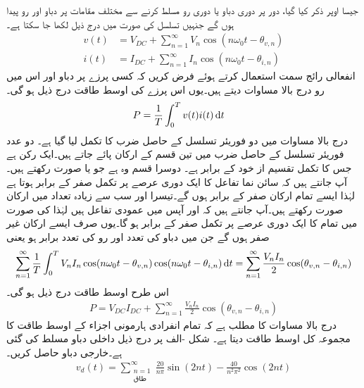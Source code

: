 جیسا اوپر ذکر کیا گیا، دور پر دوری دباو یا دوری رو مسلط کرنے سے مختلف مقامات پر دباو اور رو پیدا ہوں گے جنہیں تسلسل کی صورت میں درج ذیل لکھا جا سکتا ہے۔ 
\begin{align}
v(t)&=V_{DC}+\sum_{n=1}^{\infty} V_n \cos (n\omega_0 t-\theta_{v,n})\\
i(t)&=I_{DC}+\sum_{n=1}^{\infty} I_n \cos (n\omega_0 t-\theta_{i,n})
\end{align}
انفعالی رائج سمت استعمال کرتے ہوئے فرض کریں کہ کسی پرزے پر دباو اور اس میں رو درج بالا مساوات دیتے ہیں۔یوں اس پرزے کی اوسط طاقت درج ذیل ہو گی۔
\begin{align}\label{مساوات_فوریئر_طاقت_الف}
P&=\frac{1}{T}\int_0^T v(t)i(t) \dif t
\end{align}
درج بالا مساوات میں دو فوریئر تسلسل کے حاصل ضرب کا تکمل لیا گیا ہے۔ دو عدد فوریئر تسلسل کے حاصل ضرب  میں تین قسم کے ارکان پائے جاتے ہیں۔ایک رکن  ہے جس کا تکمل تقسیم  از خود  کے برابر ہے۔ دوسرا قسم وہ ہے جو  یا  صورت رکھتے ہیں۔ آپ جانتے ہیں کہ سائن نما تفاعل کا ایک دوری عرصے پر تکمل صفر کے برابر ہوتا ہے لہٰذا ایسے تمام ارکان صفر کے برابر ہوں گے۔تیسرا اور سب سے زیادہ تعداد میں  ارکان  صورت رکھتے ہیں۔آپ جانتے ہیں کہ  اور  آپس میں عمودی تفاعل ہیں لہٰذا  کی صورت میں تمام 
  کا ایک دوری عرصے پر تکمل صفر کے برابر ہو گا۔یوں صرف ایسے ارکان غیر صفر ہوں گے جن میں دباو کی تعدد  اور رو کی تعدد برابر ہو یعنی
\begin{align*}
\sum_{n=1}^{\infty} \frac{1}{T}\int_0^T V_n I_n \cos(n\omega_0 t-\theta_{v,n})\cos(n\omega_0 t-\theta_{i,n}) \dif t=\sum_{n=1}^{\infty} \frac{V_n I_n}{2} \cos(\theta_{v,n}-\theta_{i,n})
\end{align*}
اس طرح اوسط طاقت درج ذیل ہو گی۔
\begin{align}
P=V_{DC}I_{DC}+\sum_{n=1}^{\infty}\frac{ V_n I_n}{2} \cos(\theta_{v,n}-\theta_{i,n})
\end{align}
درج بالا مساوات کا مطلب ہے کہ تمام انفرادی ہارمونی اجزاء کے اوسط طاقت کا مجموعہ کل اوسط طاقت دیتا ہے۔
شکل -الف پر درج ذیل داخلی دباو  مسلط کی گئی ہے۔خارجی دباو  حاصل کریں۔
\begin{align*}
v_d(t)=\sum_{\substack{n=1 \\ \text{طاق}}}^{\infty} \frac{20}{n\pi}\sin (2nt)-\frac{40}{n^2\pi^2}\cos(2nt)
\end{align*}
